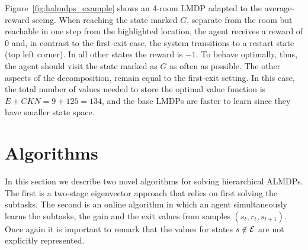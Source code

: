   \begin{example}[Example 1]Figure~\ref{fig:halmdps_example} shows an 4-room LMDP adapted to the average-reward seeing. When reaching the state marked $G$, separate from the room but reachable in one step from the highlighted location, the agent receives a reward of $0$ and, in contrast to the first-exit case, the system transitions to a restart state (top left corner). In all other states the reward is $-1$. To behave optimally, thus, the agent should visit the state marked as $G$ as often as possible. The other aspects of the decomposition, remain equal to the first-exit setting. %
    In this case, the total number of values needed to store the optimal value function is $E+CKN=9+125=134$, and the base LMDPs are faster to learn since they have smaller state space.
  \end{example}

\section{Algorithms}
In this section we describe two novel algorithms for solving hierarchical ALMDPs. The first is a two-stage eigenvector approach that relies on first solving the subtasks. The second is an online algorithm in which an agent simultaneously learns the subtasks, the gain and the exit values from samples $(s_t, r_t, s_{t+1})$.
Once again it is important to remark that the values for states $s\notin\mathcal{E}$ are not explicitly represented.

